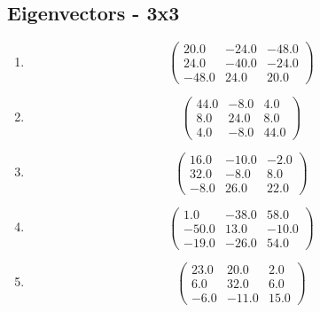 \documentclass{article}%
\begin{document}
\subsection{Eigenvectors {-} 3x3}%
\begin{enumerate}[label=\arabic*),start=51]%
\item%
\[%
\begin{pmatrix}%
20.0&-24.0&-48.0\\%
24.0&-40.0&-24.0\\%
-48.0&24.0&20.0%
\end{pmatrix}%
\]%
\item%
\[%
\begin{pmatrix}%
44.0&-8.0&4.0\\%
8.0&24.0&8.0\\%
4.0&-8.0&44.0%
\end{pmatrix}%
\]%
\item%
\[%
\begin{pmatrix}%
16.0&-10.0&-2.0\\%
32.0&-8.0&8.0\\%
-8.0&26.0&22.0%
\end{pmatrix}%
\]%
\item%
\[%
\begin{pmatrix}%
1.0&-38.0&58.0\\%
-50.0&13.0&-10.0\\%
-19.0&-26.0&54.0%
\end{pmatrix}%
\]%
\item%
\[%
\begin{pmatrix}%
23.0&20.0&2.0\\%
6.0&32.0&6.0\\%
-6.0&-11.0&15.0%
\end{pmatrix}%
\]%
\end{enumerate}

%
\end{document}
